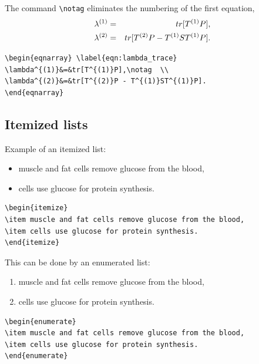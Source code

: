 \documentclass[11pt]{book}
\begin{document}
The command \verb+\notag+ eliminates the numbering of the first equation,
\begin{eqnarray} \label{eqn:lambda_trace}
\lambda^{(1)}&=&tr[T^{(1)}P],\notag  \\
\lambda^{(2)}&=&tr[T^{(2)}P - T^{(1)}ST^{(1)}P].
\end{eqnarray}
\begin{verbatim}
\begin{eqnarray} \label{eqn:lambda_trace}
\lambda^{(1)}&=&tr[T^{(1)}P],\notag  \\
\lambda^{(2)}&=&tr[T^{(2)}P - T^{(1)}ST^{(1)}P].
\end{eqnarray}
\end{verbatim}


\subsection{Itemized lists}
Example of an itemized list:
\begin{itemize}
\item muscle and fat cells remove glucose from the blood,
\item cells use glucose for protein synthesis.
\end{itemize}
\begin{verbatim}
\begin{itemize}
\item muscle and fat cells remove glucose from the blood,
\item cells use glucose for protein synthesis.
\end{itemize}
\end{verbatim}
This can be done by an enumerated  list:
\begin{enumerate}
\item muscle and fat cells remove glucose from the blood,
\item cells use glucose for protein synthesis.
\end{enumerate}

\begin{verbatim}
\begin{enumerate}
\item muscle and fat cells remove glucose from the blood,
\item cells use glucose for protein synthesis.
\end{enumerate}
\end{verbatim}



\newpage
\end{document}

